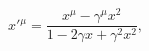 \begin{equation}
x'{}^\mu=\frac{x^\mu-\gamma^\mu x^2}{1
-2\gamma x + \gamma^2 x^2},
\label{confin}
\end{equation}

